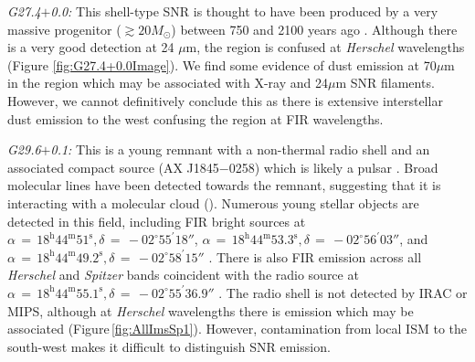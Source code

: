 \documentclass[fleqn,usenatbib]{mnras}
\begin{document}
{\textit{G27.4$+$0.0:} This shell-type SNR is thought to have been produced by a very massive progenitor ($\gtrsim 20 M_\odot$) between 750 and 2100 years ago \citep{Kumar2014}. Although there is a very good detection at 24 $\mu$m, the region is confused at \textit{Herschel} wavelengths (Figure \ref{fig:G27.4+0.0Image}). We find some evidence of dust emission at 70$\mu$m in the region which may be associated with X-ray and 24$\mu$m SNR filaments. However, we cannot definitively conclude this as there is extensive interstellar dust emission to the west confusing the region at FIR wavelengths.
\bigskip

\textit{G29.6$+$0.1:} This is a young remnant \citep[< 8000 yrs,][]{Gaensler1999} with a non-thermal radio shell and an associated compact source (AX J1845$-$0258) which is likely a pulsar \citep{Gaensler1999, Vasisht2000}. Broad molecular lines have been detected towards the remnant, suggesting that it is interacting with a molecular cloud (\citealp{Kilpatrick2016}).
Numerous young stellar objects are detected in this field, including FIR bright sources at $\alpha\,=\,18^\text{h}44^\text{m}51^\text{s}, \delta\,=\,-02^\circ55^\prime18''$, $\alpha\,=\,18^\text{h}44^\text{m}53.3^\text{s}, \delta\,=\,-02^\circ56^\prime03''$, and $\alpha\,=\,18^\text{h}44^\text{m}49.2^\text{s}, \delta\,=\,-02^\circ58^\prime15''$ \citep{Veneziani2013}. There is also FIR emission across all \textit{Herschel} and  \textit{Spitzer}  bands coincident with the radio source at $\alpha\,=\,18^\text{h}44^\text{m}55.1^\text{s}, \delta\,=\,-02^\circ55^\prime36.9''$ \citep{Gaensler1999}. The radio shell is not detected by IRAC or MIPS, although at \textit{Herschel} wavelengths there is emission which may be associated (Figure\,\ref{fig:AllImsSp1}). However, contamination from local ISM to the south-west makes it difficult to distinguish SNR emission.
\bigskip

}
\end{document}
